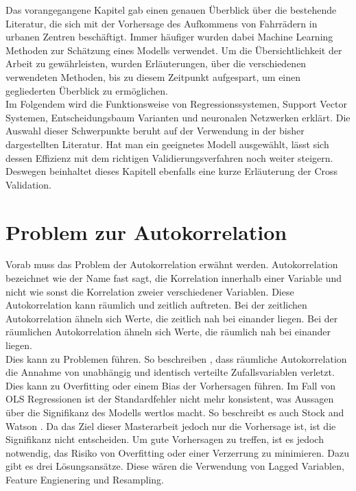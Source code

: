 \documentclass[a4paper,12pt]{thesis}
\begin{document}
Das vorangegangene Kapitel gab einen genauen Überblick über die bestehende Literatur, die sich mit der Vorhersage des Aufkommens von Fahrrädern in urbanen Zentren beschäftigt. Immer häufiger wurden dabei Machine Learning Methoden zur Schätzung eines Modells verwendet. Um die Übersichtlichkeit der Arbeit zu gewährleisten, wurden Erläuterungen, über die verschiedenen verwendeten Methoden, bis zu diesem Zeitpunkt aufgespart, um einen gegliederten Überblick zu ermöglichen.\\
Im Folgendem wird die Funktionsweise von Regressionssystemen, Support Vector Systemen, Entscheidungsbaum Varianten und neuronalen Netzwerken erklärt. Die Auswahl dieser Schwerpunkte beruht auf der Verwendung in der bisher dargestellten Literatur. Hat man ein geeignetes Modell ausgewählt, lässt sich dessen Effizienz mit dem richtigen Validierungsverfahren noch weiter steigern. Deswegen beinhaltet dieses Kapitell ebenfalls eine kurze Erläuterung der Cross Validation.

\section{Problem zur Autokorrelation}

Vorab muss das Problem der Autokorrelation erwähnt werden. Autokorrelation bezeichnet wie der Name fast sagt, die Korrelation innerhalb einer Variable und nicht wie sonst die Korrelation zweier verschiedener Variablen. Diese Autokorrelation kann räumlich und zeitlich auftreten. Bei der zeitlichen Autokorrelation ähneln sich Werte, die zeitlich nah bei einander liegen. Bei der räumlichen Autokorrelation ähneln sich Werte, die räumlich nah bei einander liegen.\\ 
Dies kann zu Problemen führen. So beschreiben \cite{LiuAutocorrelation2022}, dass räumliche Autokorrelation die Annahme von unabhängig und identisch verteilte Zufallsvariablen verletzt. Dies kann zu Overfitting oder einem Bias der Vorhersagen führen. Im Fall von OLS Regressionen ist der Standardfehler nicht mehr konsistent, was Aussagen über die Signifikanz des Modells wertlos macht. So beschreibt es auch Stock and Watson \cite{Stock2015b}. Da das Ziel dieser Masterarbeit jedoch nur die Vorhersage ist, ist die Signifikanz nicht entscheiden. Um gute Vorhersagen zu treffen, ist es jedoch notwendig, das Risiko von Overfitting oder einer Verzerrung zu minimieren. Dazu gibt es drei Lösungsansätze. Diese wären die Verwendung von Lagged Variablen, Feature Engienering und Resampling.\\
\end{document}

